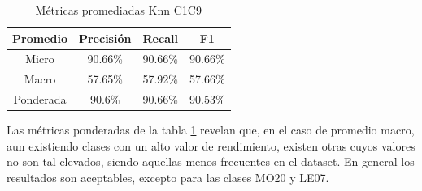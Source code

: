 \begin{table}[H]	
	\centering
	\captionsetup{justification=centering}
	\begin{tabular}{|c|c|c|c|}
		\hline
		Promedio & Precisión & Recall & F1 \\ \hline
		Micro & 90.66\% & 90.66\% & 90.66\% \\ \hline
		Macro & 57.65\% & 57.92\% & 57.66\% \\ \hline
		Ponderada & 90.6\% & 90.66\% & 90.53\% \\ \hline
	\end{tabular}
	\caption{Métricas promediadas Knn C1C9}
	\label{res:knn_report_resumen_c1c9}
\end{table}

Las métricas ponderadas de la tabla \ref{res:knn_report_resumen_c1c9} revelan que, en el caso de promedio macro, aun existiendo clases con un alto valor de rendimiento, existen otras cuyos valores no son tal elevados, siendo aquellas menos frecuentes en el dataset. En general los resultados son aceptables, excepto para las clases MO20 y LE07.


